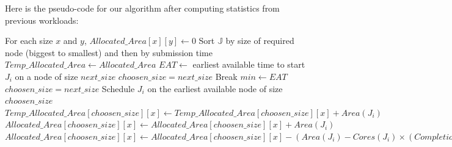 \documentclass[a4paper]{article}
\newcommand{\core}{\mathit{Cores}\xspace}
\newcommand{\completiontime}{\mathit{Completiontime}\xspace}
\newcommand{\start}{\mathit{Starttime}\xspace}
\newcommand{\jobset}{\ensuremath{\mathbb{J}}\xspace}
\begin{document}
Here is the pseudo-code for our algorithm after computing statistics from previous workloads:
\begin{algorithm}[H]
\caption{Area filling}
\begin{algorithmic}[1]
\State For each size $x$ and $y$, $Allocated\_Area[x][y] \gets 0$
\State Sort $\jobset$ by size of required node (biggest to smallest) and then by submission time
		\State $Temp\_Allocated\_Area \gets Allocated\_Area$
		 
				\State $EAT \gets$ earliest available time to start $J_i$ on a node of size $next\_size$
					\State $choosen\_size = next\_size$
					\State Break
					\State $min \gets EAT$
					\State $choosen\_size = next\_size$
				\EndIf
			\EndIf
		\EndFor
		\State Schedule $J_i$ on the earliest available node of size $choosen\_size$
		\State $Temp\_Allocated\_Area[choosen\_size][x] \gets Temp\_Allocated\_Area[choosen\_size][x] + Area(J_i)$
	\EndIf
		\State $Allocated\_Area[choosen\_size][x] \gets Allocated\_Area[choosen\_size][x] + Area(J_i)$
	\EndIf
		\State $Allocated\_Area[choosen\_size][x] \gets Allocated\_Area[choosen\_size][x] - (Area(J_i) - \core(J_i) \times (\completiontime(J_i) - \start(J_i)))$
	\EndIf
\EndWhile
\end{algorithmic}
\end{algorithm}

\end{document}
